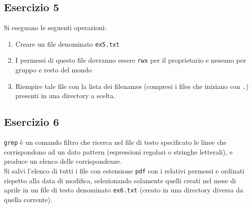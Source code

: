 \documentclass{article}
\def\code#1{\texttt{#1}}
\begin{document}
\subsection*{Esercizio 5}
Si eseguano le seguenti operazioni:
\begin{enumerate}
\item Creare un file denominato \code{ex5.txt}
\item I permessi di questo file dovranno essere \code{rwx} per il proprietario e nessuno per gruppo e resto del mondo
\item Riempire tale file con la lista dei filenames (compresi i files che iniziano con \code{.}) presenti in una directory a scelta.
\end{enumerate}

\subsection*{Esercizio 6}
\code{grep} è un comando filtro che ricerca nel file di testo specificato le linee che corrispondono ad un dato pattern (espressioni regolari o stringhe letterali), e produce un elenco delle corrispondenze.\\

Si salvi l'elenco di tutti i file con estensione \code{pdf} con i relativi permessi e ordinati rispetto alla data di modifica, selezionando solamente quelli creati nel mese di aprile in un file di testo denominato \code{ex6.txt} (creato in una directory diversa da quella corrente).
\end{document}
